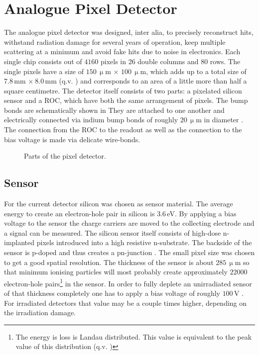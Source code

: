 \section{Analogue Pixel Detector}\label{s130}
The analogue pixel detector was designed, inter alia, to precisely reconstruct hits, withstand radiation damage for several years of operation, keep multiple scattering at a minimum and avoid fake hits due to noise in electronics. Each single chip consists out of $4160$ pixels in $26$ double columns and $80$ rows. The single pixels have a size of $150\,\upmu$m $\times$ $100\,\upmu$m, which adds up to a total size of $7.8\,$mm $\times\ 8.0\,$mm (q.v. ) and corresponds to an area of a little more than half a square centimetre. The detector itself consists of two parts: a pixelated silicon sensor and a \ac{ROC}, which have both the same arrangement of pixels. The bump bonds are schematically shown in  They are attached to one another and electrically connected via indium bump bonds of roughly $20\,\upmu$m in diameter \cite{kaestli}. The connection from the \ac{ROC} to the readout as well as the connection to the bias voltage is made via delicate wire-bonds.
\begin{figure}[ht]
	\centering
	\hfill
	\caption{Parts of the pixel detector.}
	\label{panaroc}
\end{figure}\no
\subsection{Sensor}\label{s220}
For the current detector silicon was chosen as sensor material. The average energy to create an electron-hole pair in silicon is $3.6\,$eV. By applying a bias voltage to the sensor the charge carriers are moved to the collecting electrode and a signal can be measured. The silicon sensor itself consists of high-dose n-implanted pixels introduced into a high resistive n-substrate. The backside of the sensor is p-doped and thus creates a pn-junction \cite{allkofer}. The small pixel size was chosen to get a good spatial resolution. The thickness of the sensor is about $285\,\upmu$m so that minimum ionising particles will most probably create approximately $22000$ electron-hole pairs\footnote{The energy is loss is Landau distributed. This value is equivalent to the peak value of this distribution (q.v. )} in the sensor. In order to fully deplete an unirradiated sensor of that thickness completely one has to apply a bias voltage of roughly $100\,$V \cite{pixadd}. For irradiated detectors that value may be a couple times higher, depending on the irradiation damage. 
